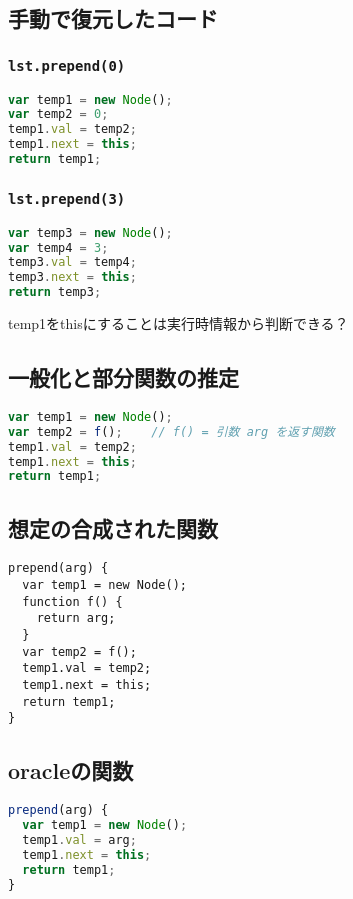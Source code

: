 \documentclass{article}
\begin{document}
\subsection{手動で復元したコード}

\subsubsection{\texttt{lst.prepend(0)}}
\begin{lstlisting}[language=JavaScript]
var temp1 = new Node();
var temp2 = 0;
temp1.val = temp2;
temp1.next = this;
return temp1;
\end{lstlisting}

\subsubsection{\texttt{lst.prepend(3)}}
\begin{lstlisting}[language=JavaScript]
var temp3 = new Node();
var temp4 = 3;
temp3.val = temp4;
temp3.next = this;
return temp3;
\end{lstlisting}

temp1をthisにすることは実行時情報から判断できる？

\subsection{一般化と部分関数の推定}

\begin{lstlisting}[language=JavaScript]
var temp1 = new Node();
var temp2 = f();    // f() = 引数 arg を返す関数
temp1.val = temp2;
temp1.next = this;
return temp1;
\end{lstlisting}

\subsection{想定の合成された関数}
\begin{lstlisting}
prepend(arg) {
  var temp1 = new Node();
  function f() {
    return arg;
  }
  var temp2 = f();
  temp1.val = temp2;
  temp1.next = this;
  return temp1;
}
\end{lstlisting}

\subsection{oracleの関数}
\begin{lstlisting}[language=JavaScript]
prepend(arg) {
  var temp1 = new Node();
  temp1.val = arg;
  temp1.next = this;
  return temp1;
}
\end{lstlisting}
\end{document}
